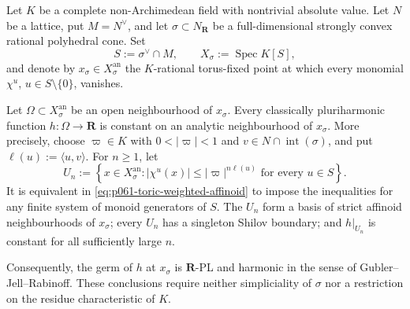 \begin{theorem}
\label{thm:p061-toric-fixed-point-constancy}
Let \(K\) be a complete non-Archimedean field with nontrivial absolute
value.  Let \(N\) be a lattice, put \(M=N^{\vee}\), and let
\(\sigma\subset N_{\mathbf R}\) be a full-dimensional strongly convex
rational polyhedral cone.  Set
\[
 S:=\sigma^{\vee}\cap M,
 \qquad
 X_{\sigma}:=\operatorname{Spec}K[S],
\]
and denote by \(x_{\sigma}\in X_{\sigma}^{\mathrm{an}}\) the
\(K\)-rational torus-fixed point at which every monomial
\(\chi^u\), \(u\in S\setminus\{0\}\), vanishes.

Let \(\Omega\subset X_{\sigma}^{\mathrm{an}}\) be an open neighbourhood
of \(x_{\sigma}\).  Every classically pluriharmonic function
\(h:\Omega\to\mathbf R\) is constant on an analytic neighbourhood of
\(x_{\sigma}\).  More precisely, choose
\(\varpi\in K\) with \(0<|\varpi|<1\) and
\(v\in N\cap\operatorname{int}(\sigma)\), and put
\(\ell(u):=\langle u,v\rangle\).  For \(n\geq1\), let
\begin{equation}
\label{eq:p061-toric-weighted-affinoid}
 U_n:=\left\{x\in X_{\sigma}^{\mathrm{an}}:
       |\chi^u(x)|\leq |\varpi|^{n\ell(u)}
       \text{ for every }u\in S\right\}.
\end{equation}
It is equivalent in \eqref{eq:p061-toric-weighted-affinoid} to impose the
inequalities for any finite system of monoid generators of \(S\).  The
\(U_n\) form a basis of strict affinoid neighbourhoods of
\(x_{\sigma}\); every \(U_n\) has a singleton Shilov boundary; and
\(h|_{U_n}\) is constant for all sufficiently large \(n\).

Consequently, the germ of \(h\) at \(x_{\sigma}\) is
\(\mathbf R\)-PL and harmonic in the sense of
Gubler--Jell--Rabinoff.  These conclusions require neither simpliciality
of \(\sigma\) nor a restriction on the residue characteristic of \(K\).
\end{theorem}
